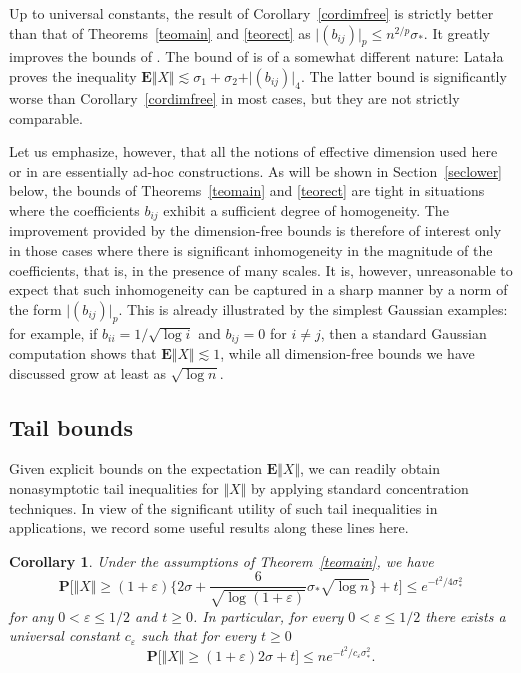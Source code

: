 \documentclass[aop,MSNbibl,dvips]{arximspdf}
\newcommand{\rrvert}{\vert}
\newcommand{\rrVert}{\Vert}
\newcommand{\llvert}{\vert}
\newcommand{\llVert}{\Vert}
\newtheorem{cor}[teo]{Corollary}
\newcommand{\EE}{\mathbf{E}}
\begin{document}
%
\begin{rem}
\label{remdimfree}
Up to universal constants, the result of Corollary~\ref{cordimfree} is
strictly better than that of Theorems~\ref{teomain} and \ref{teorect}
as $\llvert (b_{ij})\rrvert _p \le n^{2/p}\sigma_*$. It greatly
improves the bounds
of \cite{RS13}. The bound of \cite{Lat05} is of a somewhat
different nature: Lata{\l}a proves the inequality
$\EE\llVert X\rrVert \lesssim\sigma_1+\sigma_2+\llvert
(b_{ij})\rrvert _4$. The latter bound is
significantly worse than Corollary~\ref{cordimfree} in most cases, but
they are not strictly comparable.

Let us emphasize, however, that all the notions of effective dimension
used here or in \cite{Lat05,RS13} are essentially ad-hoc constructions.
As will be shown in Section~\ref{seclower} below, the bounds of
Theorems~\ref{teomain} and \ref{teorect} are tight in situations where
the
coefficients $b_{ij}$ exhibit a sufficient degree of homogeneity. The
improvement provided by the dimension-free bounds is therefore of interest
only in those cases where there is significant inhomogeneity in the
magnitude of the coefficients, that is, in the presence of many scales.
It is, however, unreasonable to expect that such inhomogeneity can be
captured in a sharp manner by a norm of the form $\llvert
(b_{ij})\rrvert _p$. This is
already illustrated by the simplest Gaussian examples: for example, if
$b_{ii}=1/\sqrt{\log i}$ and $b_{ij}=0$ for $i\ne j$, then a standard
Gaussian computation shows that $\EE\llVert X\rrVert \lesssim1$,
while all
dimension-free bounds we have discussed grow at least as $\sqrt{\log n}$.
\end{rem}

\subsection{Tail bounds}\label{sectail}

Given explicit bounds on the expectation $\EE\llVert X\rrVert $, we
can readily
obtain nonasymptotic tail inequalities for $\llVert X\rrVert $ by
applying standard
concentration techniques. In view of the significant utility of such tail
inequalities in applications, we record some useful results along
these lines here.

%
\begin{cor}
\label{corconcmain}
Under the assumptions of Theorem~\ref{teomain}, we have
%
\[
\mathbf{P} \biggl[ \llVert X\rrVert\ge(1+\varepsilon)\biggl\{2\sigma+
\frac{6}{\sqrt{\log(1+\varepsilon)}} \sigma_*\sqrt{\log n}\biggr\} + t
\biggr] \le e^{-t^2/4\sigma_*^2}
%
\]
%
for any $0<\varepsilon\le1/2$ and $t\ge0$. In particular, for every
$0<\varepsilon\le1/2$ there exists a universal constant
$c_\varepsilon$
such that for every $t\ge0$
%
\[
\mathbf{P}\bigl[ \llVert X\rrVert\ge(1+\varepsilon)2\sigma+ t \bigr]
\le
ne^{-t^2/c_\varepsilon\sigma_*^2}. %
\]
%
\end{cor}
\end{document}
